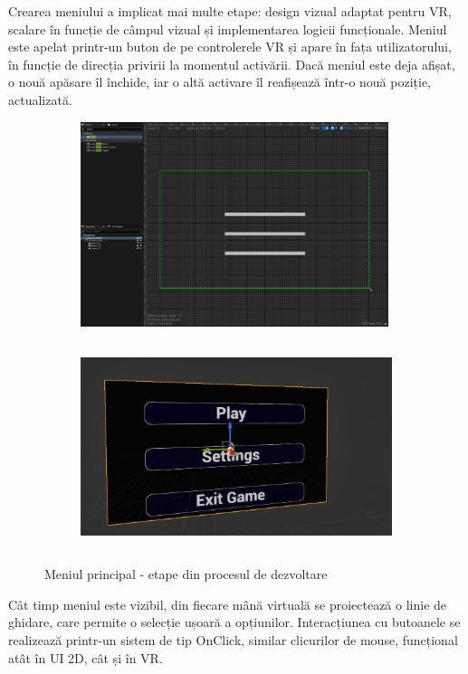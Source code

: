Crearea meniului a implicat mai multe etape: design vizual adaptat pentru VR, scalare în funcție de câmpul vizual și implementarea logicii funcționale. Meniul este apelat printr-un buton de pe controlerele VR și apare în fața utilizatorului, în funcție de direcția privirii la momentul activării. Dacă meniul este deja afișat, o nouă apăsare îl închide, iar o altă activare îl reafișează într-o nouă poziție, actualizată.

\begin{figure}[h!]
    \centering
    \begin{subfigure}{0.49\textwidth}
        \includegraphics[width=\linewidth, height=6cm]{continut/capitol3/figuri/main_menu_1.png}
        \label{fig:Menu}
    \end{subfigure}
    \hfill
    \begin{subfigure}{0.49\textwidth}
        \includegraphics[width=\linewidth, height=6cm]{continut/capitol3/figuri/menu4.png}
        \label{fig:Menu}
    \end{subfigure}
    \caption{Meniul principal - etape din procesul de dezvoltare}
\end{figure}

Cât timp meniul este vizibil, din fiecare mână virtuală se proiectează o linie de ghidare, care permite o selecție ușoară a opțiunilor. Interacțiunea cu butoanele se realizează printr-un sistem de tip OnClick, similar clicurilor de mouse, funcțional atât în UI 2D, cât și în VR.

